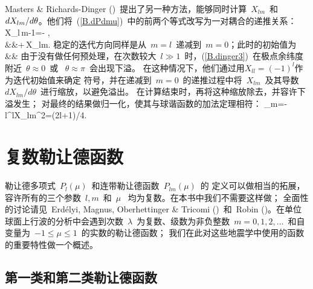 Masters \& Richards-Dinger (\citeyear{masters&dinger98})~提出了另一种方法，能够同时计算~$X_{lm}$~和~ $dX_{lm}/d\/\theta$。他们将~(\ref{B.dPdmu})~中的前两个等式改写为一对耦合的递推关系：
\eq \label{B.dinger1}
X_{l\,m-1}=-
{},
\en
\eqa \label{B.dinger2}  \nonumber \\
&&\mbox{}+\,X_{lm}.
\ena
稳定的迭代方向同样是从~$m=l$~递减到~$m=0$；此时的初始值为
\eqa \label{B.dinger3}  \nonumber \\
&&\mbox{}
\ena
由于没有做任何预处理，在次数较大~$l\gg 1$~时，(\ref{B.dinger3})~在极点余纬度附近~$\theta\approx 0$~或~ $\theta\approx\pi$~会出现下溢。
在这种情况下，他们通过用$X_{ll}=(-1)^l$作为迭代初始值来确定
符号，并在递减到~$m=0$~的递推过程中将~$X_{lm}$~及其导数~$dX_{lm}/d\theta$~进行缩放，以避免溢出。
在计算结束时，再将这种缩放除去，并容许下溢发生；
对最终的结果做归一化，使其与球谐函数的加法定理相符：
\eq \label{B.guynorm}
\sum_{m=-l}^lX_{lm}^2=(2l+1)/4\pi.
\en
{}%

\section{复数勒让德函数}
%
%
\label{sec:travel}

勒让德多项式~$P_l(\mu)$~和连带勒让德函数~$P_{lm}(\mu)$~的
定义可以做相当的拓展，容许所有的三个参数~$l,m$~和~$\mu$~ 均为复数。在本书中我们不需要这样做；
全面性的讨论请见~Erd\'{e}lyi, Magnus, Oberhettinger \& Tricomi
(\citeyear{erdelyi&al53})~和~Robin (\citeyear{robin58})。在单位球面上行波的分析中会遇到次数~$\lambda$~为复数、级数为非负整数~$m=0,1,2,\ldots$~和自变量为~$-1\leq\mu\leq 1$~的实数的勒让德函数；
我们在此对这些地震学中使用的函数的重要特性做一个概述。

\subsection{第一类和第二类勒让德函数}
%
%

